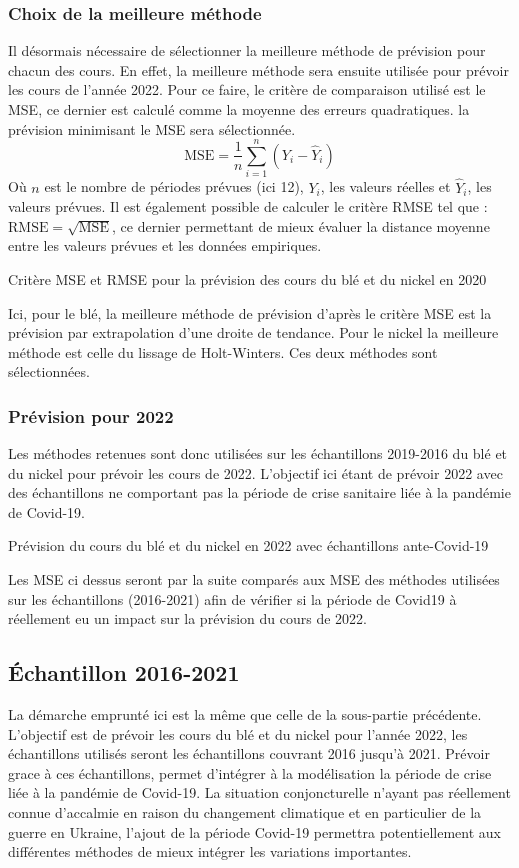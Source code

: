 \subsubsection{Choix de la meilleure méthode}
Il désormais nécessaire de sélectionner la meilleure méthode de prévision pour chacun des cours. En effet, la meilleure méthode sera ensuite utilisée pour prévoir les
cours de l'année 2022. Pour ce faire, le critère de comparaison utilisé est le MSE, ce dernier est calculé comme la moyenne des erreurs quadratiques. la prévision 
minimisant le MSE sera sélectionnée.
\begin{equation*}
    \text{MSE} = \frac{1}{n} \sum_{i=1}^{n} (Y_{i} - \hat{Y}_{i})
\end{equation*}
Où $n$ est le nombre de périodes prévues (ici 12), $Y_{i}$, les valeurs réelles et $\hat{Y}_{i}$, les valeurs prévues. Il est également possible de calculer le critère
RMSE tel que : $\text{RMSE} = \sqrt{\text{MSE}}$, ce dernier permettant de mieux évaluer la distance moyenne entre les valeurs prévues et les données empiriques.
\begin{table}[H]
    \centering
    \caption{Critère MSE et RMSE pour la prévision des cours du blé et du nickel en 2020}
    \sffamily
    
\end{table}
Ici, pour le blé, la meilleure méthode de prévision d'après le critère MSE est la prévision par extrapolation d'une droite de tendance. Pour le nickel la meilleure méthode
est celle du lissage de Holt-Winters. Ces deux méthodes sont sélectionnées.
\subsubsection{Prévision pour 2022}
Les méthodes retenues sont donc utilisées sur les échantillons 2019-2016 du blé et du nickel pour prévoir les cours de 2022. L'objectif ici étant de prévoir 2022 avec des
échantillons ne comportant pas la période de crise sanitaire liée à la pandémie de Covid-19.
\begin{table}[H]
    \centering
    \caption{Prévision du cours du blé et du nickel en 2022 avec échantillons ante-Covid-19 }
    \sffamily
    
\end{table}
Les MSE ci dessus seront par la suite comparés aux MSE des méthodes utilisées sur les échantillons (2016-2021) afin de vérifier si la période de Covid19 à réellement eu un impact sur la prévision du cours de 2022.
\subsection{Échantillon 2016-2021}
La démarche emprunté ici est la même que celle de la sous-partie précédente. L'objectif est de prévoir les cours du blé et du nickel
pour l'année 2022, les échantillons utilisés seront les échantillons couvrant 2016 jusqu'à 2021. Prévoir grace à ces échantillons, permet d'intégrer à la
modélisation la période de crise liée à la pandémie de Covid-19. La situation conjoncturelle n'ayant pas réellement connue d'accalmie en raison du changement climatique et 
en particulier de la guerre en Ukraine, l'ajout de la période Covid-19 permettra potentiellement aux différentes méthodes de mieux intégrer les variations importantes.
